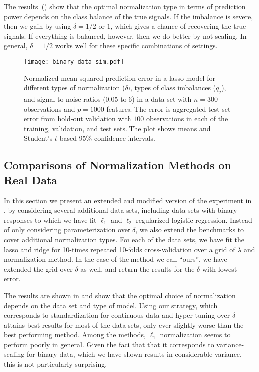 The results~() show that the optimal normalization type in terms of
prediction power depends on the class balance of the true signals. If the imbalance is
severe, then we gain by using \(\delta=1/2\) or \(1\), which gives a chance of recovering
the true signals. If everything is balanced, however, then we do better by not scaling. In
general, \(\delta=1/2\) works well for these specific combinations of settings.

\begin{figure}[htpb]
  \centering
  \texttt{[image: binary\_data\_sim.pdf]}
  \caption{%
    Normalized mean-squared prediction error in a lasso model for different types of
    normalization (\(\delta\)), types of class imbalances (\(q_j\)), and signal-to-noise ratios
    (0.05 to 6) in a data set with \(n=300\) observations and \(p = \num{1000}\) features. The
    error is aggregated test-set error from hold-out validation with \(100\) observations in
    each of the training, validation, and test sets. The plot shows means and Student's
    \(t\)-based 95\% confidence intervals. } \label{fig:binary-sim}
\end{figure}

\subsection{Comparisons of Normalization Methods on Real Data}
\label{sec:normalization-tuning}

In this section we present an extended and modified version of the experiment in
, by considering several additional data sets,
including data sets with binary responses to which we have fit \(\ell_1\) and
\(\ell_2\)-regularized logistic regression. Instead of only considering parameterization
over \(\delta\), we also extend the benchmarks to cover additional normalization types. For
each of the data sets, we have fit the lasso and ridge for 10-times repeated 10-folds
cross-validation over a grid of \(\lambda\) and normalization method. In the case of the
method we call ``ours'', we have extended the grid over \(\delta\) as well, and return the
results for the \(\delta\) with lowest error.

The results are shown in  and show that the optimal choice of
normalization depends on the data set and type of model. Using our strategy, which
corresponds to standardization for continuous data and hyper-tuning over \(\delta\) attains
best results for most of the data sets, only ever slightly worse than the best performing
method. Among the methods, \(\ell_1\) normalization seems to perform poorly in general.
Given the fact that that it corresponds to variance-scaling for binary data, which we have
shown results in considerable variance, this is not particularly surprising.

